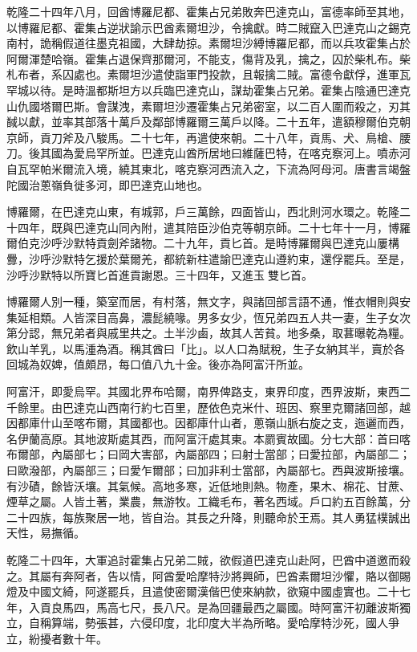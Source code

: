 \begin{pinyinscope}
乾隆二十四年八月，回酋博羅尼都、霍集占兄弟敗奔巴達克山，富德率師至其地，以博羅尼都、霍集占逆狀諭示巴酋素爾坦沙，令擒獻。時二賊竄入巴達克山之錫克南村，詭稱假道往墨克祖國，大肆劫掠。素爾坦沙縛博羅尼都，而以兵攻霍集占於阿爾渾楚哈嶺。霍集占退保齊那爾河，不能支，傷背及乳，擒之，囚於柴札布。柴札布者，系囚處也。素爾坦沙遣使詣軍門投款，且報擒二賊。富德令獻俘，進軍瓦罕城以待。是時溫都斯坦方以兵臨巴達克山，謀劫霍集占兄弟。霍集占陰通巴達克山仇國塔爾巴斯。會謀洩，素爾坦沙遷霍集占兄弟密室，以二百人圍而殺之，刃其馘以獻，並率其部落十萬戶及鄰部博羅爾三萬戶以降。二十五年，遣額穆爾伯克朝京師，貢刀斧及八駿馬。二十七年，再遣使來朝。二十八年，貢馬、犬、鳥槍、腰刀。後其國為愛烏罕所並。巴達克山酋所居地曰維薩巴特，在喀克察河上。噴赤河自瓦罕帕米爾流入境，繞其東北，喀克察河西流入之，下流為阿母河。唐書言竭盤陀國治蔥嶺負徙多河，即巴達克山地也。

博羅爾，在巴達克山東，有城郭，戶三萬餘，四面皆山，西北則河水環之。乾隆二十四年，既與巴達克山同內附，遣其陪臣沙伯克等朝京師。二十七年十一月，博羅爾伯克沙呼沙默特貢劍斧諸物。二十九年，貢匕首。是時博羅爾與巴達克山屢構釁，沙呼沙默特乞援於葉爾羌，都統新柱遣諭巴達克山遵約束，還俘罷兵。至是，沙呼沙默特以所寶匕首進貢謝恩。三十四年，又進玉雙匕首。

博羅爾人別一種，築室而居，有村落，無文字，與諸回部言語不通，惟衣帽則與安集延相類。人皆深目高鼻，濃髭繞喙。男多女少，恆兄弟四五人共一妻，生子女次第分認，無兄弟者與戚里共之。土半沙鹵，故其人苦貧。地多桑，取葚曝乾為糧。飲山羊乳，以馬湩為酒。稱其酋曰「比」。以人口為賦稅，生子女納其半，賣於各回城為奴婢，值頗昂，每口值八九十金。後亦為阿富汗所並。

阿富汗，即愛烏罕。其國北界布哈爾，南界俾路支，東界印度，西界波斯，東西二千餘里。由巴達克山西南行約七百里，歷依色克米什、班因、察里克爾諸回部，越因都庫什山至喀布爾，其國都也。因都庫什山者，蔥嶺山脈右旋之支，迤邐而西，名伊蘭高原。其地波斯處其西，而阿富汗處其東。本罽賓故國。分七大部：首曰喀布爾部，內屬部七；曰岡大害部，內屬部四；曰射士當部；曰愛拉部，內屬部二；曰歐潑部，內屬部三；曰愛乍爾部；曰加非利士當部，內屬部七。西與波斯接壤。有沙磧，餘皆沃壤。其氣候。高地多寒，近低地則熱。物產，果木、棉花、甘蔗、煙草之屬。人皆土著，業農，無游牧。工織毛布，著名西域。戶口約五百餘萬，分二十四族，每族聚居一地，皆自治。其長之升降，則聽命於王焉。其人勇猛樸誠出天性，易撫循。

乾隆二十四年，大軍追討霍集占兄弟二賊，欲假道巴達克山赴阿，巴酋中道邀而殺之。其屬有奔阿者，告以情，阿酋愛哈摩特沙將興師，巴酋素爾坦沙懼，賂以御賜燈及中國文綺，阿遂罷兵，且遣使密爾漢偕巴使來納款，欲窺中國虛實也。二十七年，入貢良馬四，馬高七尺，長八尺。是為回疆最西之屬國。時阿富汗初離波斯獨立，自稱算端，勢張甚，六侵印度，北印度大半為所略。愛哈摩特沙死，國人爭立，紛擾者數十年。


\end{pinyinscope}
